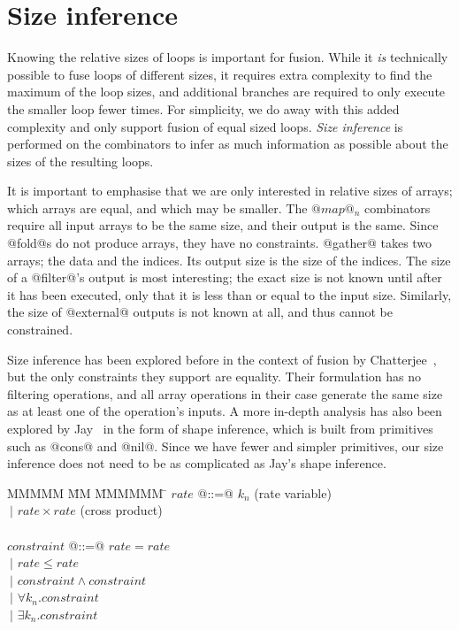 \section{Size inference}

Knowing the relative sizes of loops is important for fusion.
While it \emph{is} technically possible to fuse loops of different sizes, it requires extra complexity to find the maximum of the loop sizes, and additional branches are required to only execute the smaller loop fewer times. For simplicity, we do away with this added complexity and only support fusion of equal sized loops. \emph{Size inference} is performed on the combinators to infer as much information as possible about the sizes of the resulting loops.

It is important to emphasise that we are only interested in relative sizes of arrays; which arrays are equal, and which may be smaller.
The $@map@_n$ combinators require all input arrays to be the same size, and their output is the same.
Since @fold@s do not produce arrays, they have no constraints.
@gather@ takes two arrays; the data and the indices. Its output size is the size of the indices.
The size of a @filter@'s output is most interesting; the exact size is not known until after it has been executed, only that it is less than or equal to the input size.
Similarly, the size of @external@ outputs is not known at all, and thus cannot be constrained.

Size inference has been explored before in the context of fusion by Chatterjee~\cite{chatterjee1991size}, but the only constraints they support are equality.
Their formulation has no filtering operations, and all array operations in their case generate the same size as at least one of the operation's inputs.
A more in-depth analysis has also been explored by Jay~\cite{jay1996shape} in the form of shape inference, which is built from primitives such as @cons@ and @nil@.
Since we have fewer and simpler primitives, our size inference does not need to be as complicated as Jay's shape inference.


\begin{tabbing}
MMMMM       \= MM \= MMMMMM \= \kill
$rate$      \> @::=@ \> $k_n$               \> (rate variable)\\
            \> $~|$  \> $rate \times rate$  \> (cross product) \\
\\
$constraint$ \> @::=@ \> $rate = rate$                      \\
             \> $~|$  \> $rate \le rate$                    \\
             \> $~|$  \> $constraint \wedge constraint$     \\
             \> $~|$  \> $\forall k_n. constraint$          \\
             \> $~|$  \> $\exists k_n. constraint$          \\
\end{tabbing}

